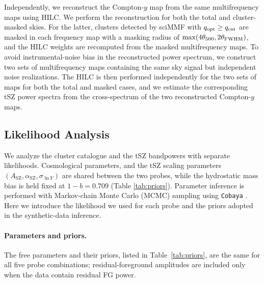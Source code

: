 \documentclass[aps,prd,twocolumn,superscriptaddress,nofootinbib,floatfix]{revtex4-2}
\begin{document}
Independently, we reconstruct the Compton-$y$ map from the same multifrequency maps using HILC. We perform the reconstruction for both the total and cluster-masked skies. For the latter, clusters detected by sciMMF with $q_{\rm opt}\geq q_{\rm cat}$ are masked in each frequency map with a masking radius of $\max(4\theta_{500},2\theta_{\rm FWHM})$, and the HILC weights are recomputed from the masked multifrequency maps. To avoid instrumental-noise bias in the reconstructed power spectrum, we construct two sets of multifrequency maps containing the same sky signal but independent noise realizations. The HILC is then performed independently for the two sets of maps for both the total and masked cases, and we estimate the corresponding tSZ power spectra from the cross-spectrum of the two reconstructed Compton-$y$ maps.

\subsection{Likelihood Analysis}
\label{sec:methods_likelihood}
We analyze the cluster catalogue and the tSZ bandpowers with separate likelihoods. Cosmological parameters, and the tSZ scaling parameters $(A_{\mathrm{SZ}},\alpha_{\mathrm{SZ}},\sigma_{\ln Y})$ are shared between the two probes, while the hydrostatic mass bias is held fixed at $1-b=0.709$ (Table \ref{tab:priors}). Parameter inference is performed with Markov-chain Monte Carlo (MCMC) sampling using \texttt{Cobaya} \citep{TorradoLewis2021}. Here we introduce the likelihood we used for each probe and the priors adopted in the synthetic-data inference.

\paragraph{Parameters and priors.}
The free parameters and their priors, listed in Table~\ref{tab:priors}, are the same for all five probe combinations; residual-foreground amplitudes are included only when the data contain residual FG power.
\end{document}
